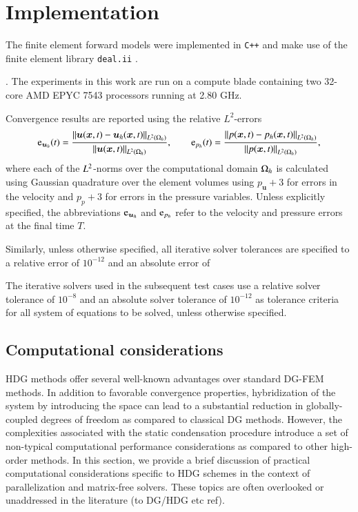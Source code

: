 

\section{Implementation}%
\label{sec:implementation_details}

The finite element forward models were implemented in \texttt{C++} and make use of the finite element library \texttt{deal.ii} \cite{dealII93}.

. 
The experiments in this work are run on a compute blade containing two 32-core AMD EPYC 7543 processors running at 2.80 GHz.

Convergence results are reported using the relative $L^2$-errors 
\begin{equation}
  \text{e}_{\bm{u}_h}(t) = \frac{ \left\lVert \bm{u}(\bm{x}, t) - \bm{u}_h(\bm{x}, t)\right\rVert_{L^2(\Omega_h)} }{ \left\lVert \bm{u}(\bm{x}, t) \right\rVert_{L^2(\Omega_h)} }, \qquad 
  \text{e}_{p_h}(t) =\frac{ \left\lVert p(\bm{x}, t) - p_h(\bm{x}, t)\right\rVert_{L^2(\Omega_h)} }{ \left\lVert p(\bm{x}, t) \right\rVert_{L^2(\Omega_h)} },
\end{equation}
where each of the $L^2$-norms over the computational domain $\Omega_h$ is calculated using Gaussian quadrature over the element volumes using $p_{\bm{u}} + 3$ for errors in the velocity and $p_{p} + 3$ for errors in the pressure variables.
Unless explicitly specified, the abbreviations $\text{e}_{\bm{u}_h}$ and $\text{e}_{p_h}$ refer to the velocity and pressure errors at the final time $T$.

Similarly, unless otherwise specified, all iterative solver tolerances are specified to a relative error of $10^{-12}$ and an absolute error of 

The iterative solvers used in the subsequent test cases use a relative solver tolerance of $10^{-8}$ and an absolute solver tolerance of $10^{-12}$ as tolerance criteria for all system of equations to be solved, unless otherwise specified.


\subsection{Computational considerations}
\label{sec:computational}

HDG methods offer several well-known advantages over standard DG-FEM methods. 
In addition to favorable convergence properties, hybridization of the system by introducing the space  can lead to a substantial reduction in globally-coupled degrees of freedom as compared to classical DG methods.
However, the complexities associated with the static condensation procedure introduce a set of non-typical computational performance considerations as compared to other high-order methods.
In this section, we provide a brief discussion of practical computational considerations specific to HDG schemes in the context of parallelization and matrix-free solvers. These topics are often overlooked or unaddressed in the literature (to DG/HDG etc ref).

